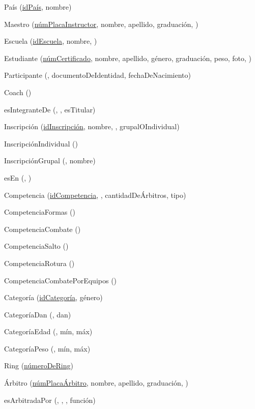 \par País (\underline{idPaís}, nombre)

\par Maestro (\underline{númPlacaInstructor}, nombre, apellido, graduación, )
\par Escuela (\underline{idEscuela}, nombre, )

\par Estudiante (\underline{númCertificado}, nombre, apellido, género, graduación, peso, foto, )
\par Participante (\underline{}, documentoDeIdentidad, fechaDeNacimiento)
\par Coach (\underline{})

\par esIntegranteDe (\underline{}, \underline{}, esTitular)
\par Inscripción (\underline{idInscripción}, nombre, , grupalOIndividual)
\par InscripciónIndividual (\underline{})
\par InscripciónGrupal (\underline{}, nombre)

\par esEn (\underline{}, \underline{})

\par Competencia (\underline{idCompetencia}, , cantidadDeÁrbitros, tipo)
\par CompetenciaFormas (\underline{})
\par CompetenciaCombate (\underline{})
\par CompetenciaSalto (\underline{})
\par CompetenciaRotura (\underline{})
\par CompetenciaCombatePorEquipos (\underline{})

\par Categoría (\underline{idCategoría}, género)
\par CategoríaDan (\underline{}, dan)
\par CategoríaEdad (\underline{}, mín, máx)
\par CategoríaPeso (\underline{}, mín, máx)

\par Ring (\underline{númeroDeRing})
\par Árbitro (\underline{númPlacaÁrbitro}, nombre, apellido, graduación, )

\par esArbitradaPor (\underline{}, \underline{}, , función)
